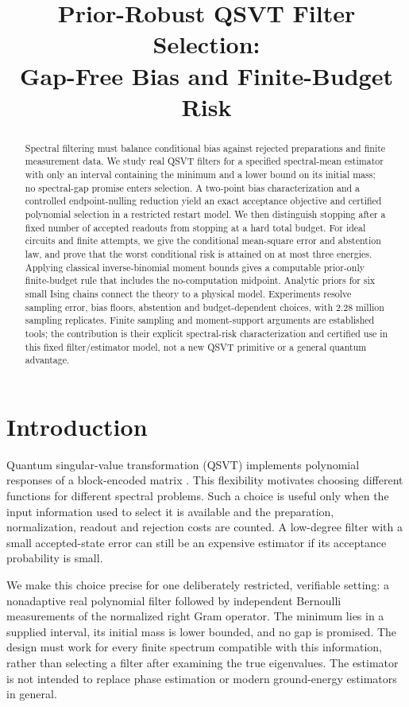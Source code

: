 \documentclass[11pt]{article}
\title{Prior-Robust QSVT Filter Selection:\\Gap-Free Bias and Finite-Budget Risk}
\author{}
\date{}
\begin{document}
\maketitle
\begin{abstract}
Spectral filtering must balance conditional bias against rejected preparations
and finite measurement data. We study real QSVT filters for a specified
spectral-mean estimator with only an interval containing the minimum and a
lower bound on its initial mass; no spectral-gap promise enters selection.
A two-point bias characterization and a controlled endpoint-nulling
reduction yield an exact acceptance objective and certified polynomial
selection in a restricted restart model. We then distinguish stopping after
a fixed number of accepted readouts from stopping at a hard total budget.
For ideal circuits and finite attempts, we give the conditional mean-square
error and abstention law, and prove that the worst conditional risk is
attained on at most three energies. Applying classical inverse-binomial
moment bounds gives a computable prior-only finite-budget rule that includes
the no-computation midpoint. Analytic priors for six small Ising chains
connect the theory to a physical model. Experiments resolve sampling error,
bias floors, abstention and budget-dependent choices, with 2.28 million
sampling replicates. Finite sampling and moment-support arguments are
established tools; the contribution is their explicit spectral-risk
characterization and certified use in this fixed filter/estimator model,
not a new QSVT primitive or a general quantum advantage.
\end{abstract}

\section{Introduction}
Quantum singular-value transformation (QSVT) implements polynomial responses
of a block-encoded matrix \cite{Gilyen,Martyn}. This flexibility motivates
choosing different functions for different spectral problems. Such a choice
is useful only when the input information used to select it is available
and the preparation, normalization, readout and rejection costs are counted.
A low-degree filter with a small accepted-state error can still be an
expensive estimator if its acceptance probability is small.

We make this choice precise for one deliberately restricted, verifiable
setting: a nonadaptive real polynomial filter followed by independent
Bernoulli measurements of the normalized right Gram operator. The minimum
lies in a supplied interval, its initial mass is lower bounded, and no
gap is promised. The design must work for every finite spectrum compatible
with this information, rather than selecting a filter after examining the
true eigenvalues. The estimator is not intended to replace phase estimation
or modern ground-energy estimators in general.
\end{document}
